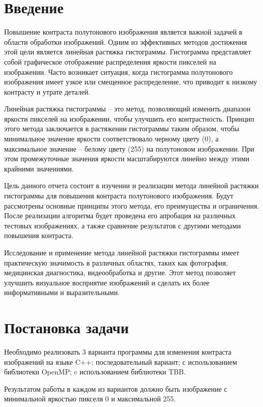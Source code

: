 \documentclass[14pt, russian]{extarticle}
\begin{document}
\pagestyle{plain}
\setcounter{page}{3}

	\section{Введение}
	Повышение контраста полутонового изображения является важной задачей в области обработки изображений. Одним из эффективных методов достижения этой цели является линейная растяжка гистограммы. Гистограмма представляет собой графическое отображение распределения яркости пикселей на изображении. Часто возникает ситуация, когда гистограмма полутонового изображения имеет узкое или смещенное распределение, что приводит к низкому контрасту и утрате деталей.
	
	Линейная растяжка гистограммы – это метод, позволяющий изменить диапазон яркости пикселей на изображении, чтобы улучшить его контрастность. Принцип этого метода заключается в растяжении гистограммы таким образом, чтобы минимальное значение яркости соответствовало черному цвету (0), а максимальное значение – белому цвету (255) на полутоновом изображении. При этом промежуточные значения яркости масштабируются линейно между этими крайними значениями.
	
	Цель данного отчета состоит в изучении и реализации метода линейной растяжки гистограммы для повышения контраста полутонового изображения. Будут рассмотрены основные принципы этого метода, его преимущества и ограничения. После реализации алгоритма будет проведена его апробация на различных тестовых изображениях, а также сравнение результатов с другими методами повышения контраста.
	
	Исследование и применение метода линейной растяжки гистограммы имеет практическую значимость в различных областях, таких как фотография, медицинская диагностика, видеообработка и другие. Этот метод позволяет улучшить визуальное восприятие изображений и сделать их более информативными и выразительными. 
	\newpage

	\section{Постановка задачи}
	Необходимо реализовать 3 варианта программы для изменения контраста изображений на языке C++: последовательный вариант; с использованием библиотеки OpenMP; c использованием библиотеки TBB.
	
	Результатом работы в каждом из вариантов должно быть изображение с минимальной яркостью пикселя 0 и максимальной 255.
	
\end{document}
